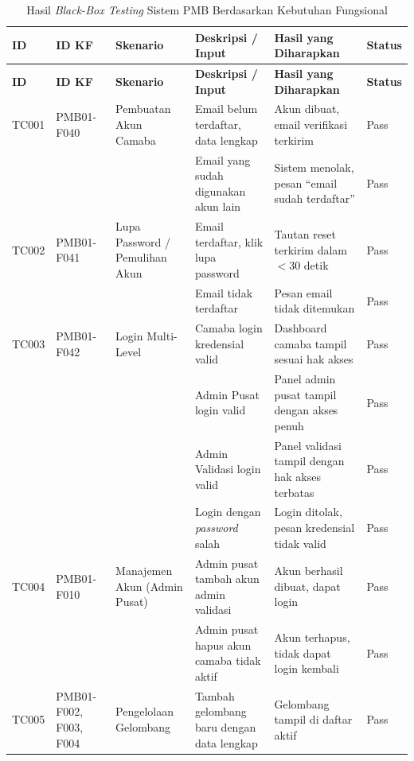 \begin{longtable}{|T{0.05\textwidth}|T{0.10\textwidth}|T{0.13\textwidth}|T{0.21\textwidth}|T{0.19\textwidth}|T{0.09\textwidth}|}
	\caption{Hasil \textit{Black-Box Testing} Sistem PMB Berdasarkan Kebutuhan Fungsional}
	\label{table:4.blackbox}\\
	\hline
	\textbf{ID} & \textbf{ID KF} & \textbf{Skenario} & \textbf{Deskripsi / Input} & \textbf{Hasil yang Diharapkan} & \textbf{Status} \\
	\hline
	\endfirsthead
	\hline
	\textbf{ID} & \textbf{ID KF} & \textbf{Skenario} & \textbf{Deskripsi / Input} & \textbf{Hasil yang Diharapkan} & \textbf{Status} \\
	\hline
	\endhead
	TC001 & PMB01-F040 & Pembuatan Akun Camaba & Email belum terdaftar, data lengkap & Akun dibuat, email verifikasi terkirim & Pass \\
	\hline
	       &            &                       & Email yang sudah digunakan akun lain & Sistem menolak, pesan ``email sudah terdaftar'' & Pass \\
	\hline
	TC002 & PMB01-F041 & Lupa Password / Pemulihan Akun & Email terdaftar, klik lupa password & Tautan reset terkirim dalam $<$30 detik & Pass \\
	\hline
	       &            &                       & Email tidak terdaftar & Pesan email tidak ditemukan & Pass \\
	\hline
	TC003 & PMB01-F042 & Login Multi-Level & Camaba login kredensial valid & Dashboard camaba tampil sesuai hak akses & Pass \\
	\hline
	       &            &                   & Admin Pusat login valid & Panel admin pusat tampil dengan akses penuh & Pass \\
	\hline
	       &            &                   & Admin Validasi login valid & Panel validasi tampil dengan hak akses terbatas & Pass \\
	\hline
	       &            &                   & Login dengan \textit{password} salah & Login ditolak, pesan kredensial tidak valid & Pass \\
	\hline
	TC004 & PMB01-F010 & Manajemen Akun (Admin Pusat) & Admin pusat tambah akun admin validasi & Akun berhasil dibuat, dapat login & Pass \\
	\hline
	       &            &                              & Admin pusat hapus akun camaba tidak aktif & Akun terhapus, tidak dapat login kembali & Pass \\
	\hline
	TC005 & PMB01-F002, F003, F004 & Pengelolaan Gelombang & Tambah gelombang baru dengan data lengkap & Gelombang tampil di daftar aktif & Pass \\

\end{longtable}

